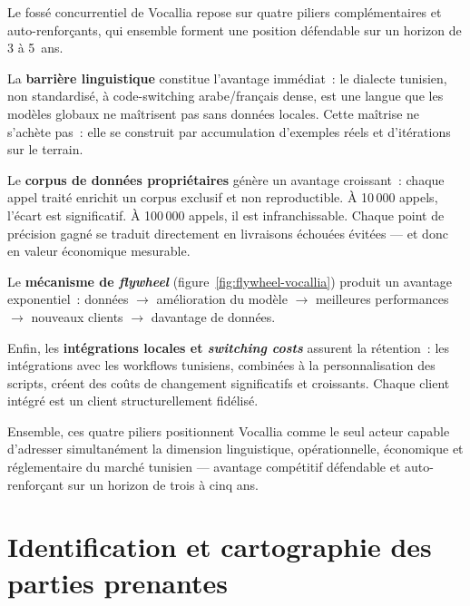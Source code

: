 \begin{tcolorbox}[colback=gray!8, colframe=gray!50, title=\textbf{Fossé concurrentiel de Vocallia --- Architecture du \emph{Moat}}, fonttitle=\bfseries]
Le fossé concurrentiel de Vocallia repose sur quatre piliers complémentaires et auto-renforçants, qui ensemble forment une position défendable sur un horizon de 3 à 5~ans.

La \textbf{barrière linguistique} constitue l'avantage immédiat~: le dialecte tunisien, non standardisé, à code-switching arabe/français dense, est une langue que les modèles globaux ne maîtrisent pas sans données locales. Cette maîtrise ne s'achète pas~: elle se construit par accumulation d'exemples réels et d'itérations sur le terrain.

Le \textbf{corpus de données propriétaires} génère un avantage croissant~: chaque appel traité enrichit un corpus exclusif et non reproductible. À 10\,000 appels, l'écart est significatif. À 100\,000 appels, il est infranchissable. Chaque point de précision gagné se traduit directement en livraisons échouées évitées --- et donc en valeur économique mesurable.

Le \textbf{mécanisme de \emph{flywheel}} (figure~\ref{fig:flywheel-vocallia}) produit un avantage exponentiel~: données $\rightarrow$ amélioration du modèle $\rightarrow$ meilleures performances $\rightarrow$ nouveaux clients $\rightarrow$ davantage de données.

Enfin, les \textbf{intégrations locales et \emph{switching costs}} assurent la rétention~: les intégrations avec les workflows tunisiens, combinées à la personnalisation des scripts, créent des coûts de changement significatifs et croissants. Chaque client intégré est un client structurellement fidélisé.

\medskip
\noindent Ensemble, ces quatre piliers positionnent Vocallia comme le seul acteur capable d'adresser simultanément la dimension linguistique, opérationnelle, économique et réglementaire du marché tunisien --- avantage compétitif défendable et auto-renforçant sur un horizon de trois à cinq ans.
\end{tcolorbox}

\section{Identification et cartographie des parties prenantes}
\label{section2.6}


